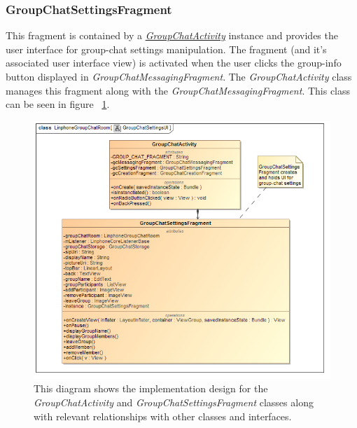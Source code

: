 \documentclass[11pt]{article}
\begin{document}
\subsubsection{GroupChatSettingsFragment}
This fragment is contained by a \textit{ \hyperref[subsubsec: groupchatactivity]{GroupChatActivity}} instance and provides the user interface for group-chat settings manipulation. The fragment (and it's associated user interface view) is activated when the user clicks the group-info button displayed in \textit{GroupChatMessagingFragment}. The \textit{GroupChatActivity} class manages this fragment along with the \textit{GroupChatMessagingFragment}. This class can be seen in figure ~\ref{cd-group-chat-settings-ui}.
\begin{figure}[H]
\centering
\includegraphics[width=5in]{./images/class_group_chat_settings_ui.png}
\caption[Android Group Chat Settings UI Class Diagram]{This diagram shows the implementation design for the \textit{GroupChatActivity} and \textit{GroupChatSettingsFragment} classes along with relevant relationships with other classes and interfaces.}
\label{cd-group-chat-settings-ui}
\end{figure}
\end{document}
